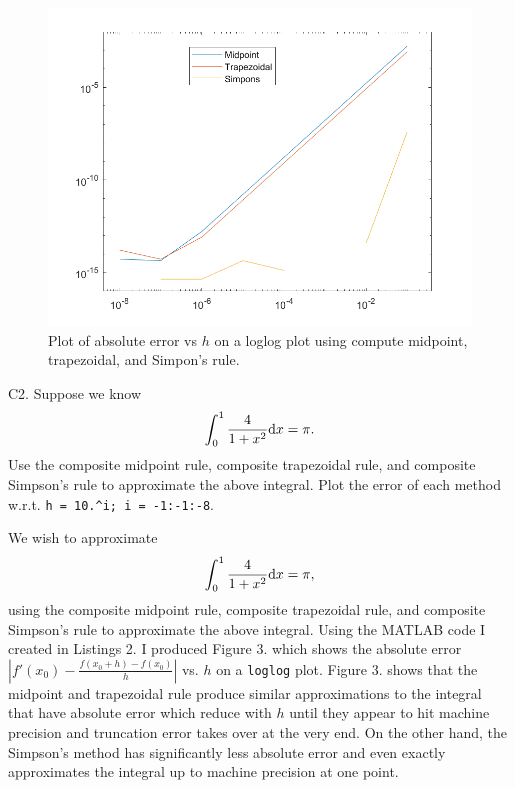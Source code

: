 \documentclass[12pt]{report}
\begin{document}
\newpage



\begin{figure}
    \center
    \includegraphics[width=.8\textwidth]{plots/c2.png}
    \caption{Plot of absolute error vs $h$ on a loglog plot using compute midpoint, trapezoidal, and Simpon's rule.}
\end{figure}

\begin{problem}
    C2. Suppose we know
    \[ 
        \int_0^1 \frac{4}{1+x^2}\mathrm{d}x = \pi.
    \]
    Use the composite midpoint rule, composite trapezoidal rule, and composite Simpson's rule to approximate the above integral. Plot the error of each method w.r.t. \verb+h = 10.^i; i = -1:-1:-8+.
\end{problem}

\begin{solution}

    \noindent
    We wish to approximate
    \[ 
        \int_0^1 \frac{4}{1+x^2}\mathrm{d}x = \pi,
    \]
    using the composite midpoint rule, composite trapezoidal rule, and composite Simpson's rule to approximate the above integral. Using the MATLAB code I created in Listings 2. I produced Figure 3. which shows the absolute error  $\left| f'(x_0) - \frac{f(x_0 + h) - f(x_0)}{h} \right|$ vs. $h$ on a \verb+loglog+ plot. Figure 3. shows that the midpoint and trapezoidal rule produce similar approximations to the integral that have absolute error which reduce with $h$ until they appear to hit machine precision and truncation error takes over at the very end. On the other hand, the Simpson's method has significantly less absolute error and even exactly approximates the integral up to machine precision at one point.     


    \center
    
\end{solution}

\newpage
\end{document}
